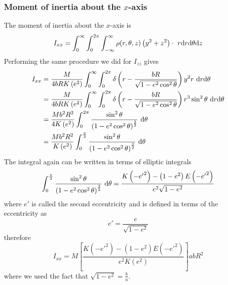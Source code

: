\subsubsection{Moment of inertia about the \texorpdfstring{\( x \)}{x}-axis}
The moment of inertia about the \( x \)-axis is
\begin{equation}
    I_{xx} = \int_{0}^{\infty} \int_{0}^{2\pi} \int_{-\infty}^{\infty} \rho(r, \theta, z) \left(y^2 + z^2\right) \cdot \,{}\,{} r \textrm{d}{r}\textrm{d}{\theta}\textrm{d}{z}
\end{equation}
Performing the same procedure we did for \( I_{zz} \) gives
\begin{align}
    I_{xx} & = \frac{M}{4bRK\left(e^2\right)} \int_{0}^{\infty} \int_{0}^{2\pi} \delta\left(r - \frac{bR}{\sqrt{1 - e^2\cos^2{\theta}}}\right) y^2 r \,{}\,{} \textrm{d}{r}\textrm{d}{\theta} \nonumber             \\
           & = \frac{M}{4bRK\left(e^2\right)} \int_{0}^{\infty} \int_{0}^{2\pi} \delta\left(r - \frac{bR}{\sqrt{1 - e^2\cos^2{\theta}}}\right) r^3\sin^2{\theta} \,{}\,{} \textrm{d}{r}\textrm{d}{\theta} \nonumber \\
           & = \frac{Mb^2R^2}{4K\left(e^2\right)}  \int_{0}^{2\pi} \frac{\sin^2{\theta}}{{\left({1 - e^2\cos^2{\theta}}\right)}^{\frac{3}{2}}}  \,{}\,{} \textrm{d}{\theta} \nonumber                        \\
           & = \frac{Mb^2R^2}{K\left(e^2\right)}  \int_{0}^{\frac{\pi}{2}} \frac{\sin^2{\theta}}{{\left({1 - e^2\cos^2{\theta}}\right)}^{\frac{3}{2}}}  \,{}\,{} \textrm{d}{\theta}
\end{align}
The integral again can be written in terms of elliptic integrals
\begin{equation}
    \int_{0}^{\frac{\pi}{2}} \frac{\sin^2{\theta}}{{\left({1 - e^2\cos^2{\theta}}\right)}^{\frac{3}{2}}}  \,{}\,{} \textrm{d}{\theta}
    = \frac{K\left(-{e'}^{2}\right) -\left(1 - e^2\right)E\left(-{e'}^{2}\right)}{e^2\sqrt{1 - e^2}}
\end{equation}
where \( e' \) is called the second eccentricity and is defined in terms of the eccentricity as
\begin{equation}
    e' = \frac{e}{\sqrt{1 - e^2}}
\end{equation}
therefore
\begin{equation}
    I_{xx} = M
    \left[
        \frac{K\left(-{e'}^{2}\right) -\left(1 - e^2\right)E\left(-{e'}^{2}\right)}{e^2K\left(e^2\right)}
        \right]
    ab R^2
\end{equation}
where we used the fact that \( \sqrt{1 - e^2} = \frac{b}{a} \).

